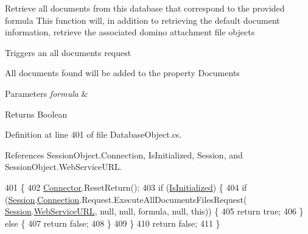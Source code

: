 Retrieve all documents from this database that correspond to the provided formula This function will, in addition to retrieving the default document information, retrieve the associated domino attachment file objects 

Triggers an all documents request

All documents found will be added to the property \textquotesingle{}Documents\textquotesingle{}


\begin{DoxyParams}{Parameters}
{\em formula} & \\
\hline
\end{DoxyParams}
\begin{DoxyReturn}{Returns}
Boolean
\end{DoxyReturn}


Definition at line 401 of file Database\+Object.\+cs.



References Session\+Object.\+Connection, Is\+Initialized, Session, and Session\+Object.\+Web\+Service\+U\+RL.


\begin{DoxyCode}
401                                                                  \{
402         \mbox{\hyperlink{class_connector}{Connector}}.ResetReturn();
403         \textcolor{keywordflow}{if} (\mbox{\hyperlink{class_database_object_a5fe036d32a30eb10d1b3f6a30263f740}{IsInitialized}}) \{
404             \textcolor{keywordflow}{if} (\mbox{\hyperlink{class_database_object_aa8484162b7d2a7c4c9426bca13c64c07}{Session}}.\mbox{\hyperlink{class_session_object_a014bdbf705a753540e19bfb53030c55c}{Connection}}.Request.ExecuteAllDocumentsFilesRequest(
      \mbox{\hyperlink{class_database_object_aa8484162b7d2a7c4c9426bca13c64c07}{Session}}.\mbox{\hyperlink{class_session_object_a697c071c812fbf7ad1166b896fb44c16}{WebServiceURL}}, null, null, formula, null, \textcolor{keyword}{this})) \{
405                 \textcolor{keywordflow}{return} \textcolor{keyword}{true};
406             \} \textcolor{keywordflow}{else} \{
407                 \textcolor{keywordflow}{return} \textcolor{keyword}{false};
408             \}
409         \}
410         \textcolor{keywordflow}{return} \textcolor{keyword}{false};
411     \}
\end{DoxyCode}
\mbox{\label{class_database_object_a6c2fb05fb6972d74d5bea67e323985fb}} 
